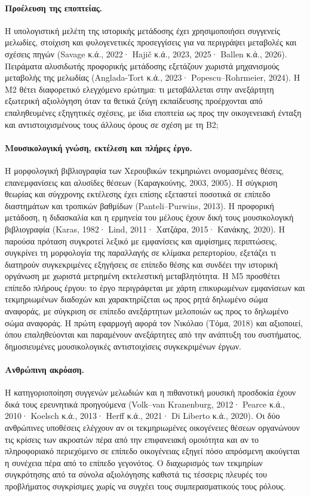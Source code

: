 \documentclass[11pt,a4paper]{article}
\begin{document}
\paragraph{Προέλευση της εποπτείας.} Η υπολογιστική μελέτη της ιστορικής μετάδοσης έχει χρησιμοποιήσει συγγενείς μελωδίες, στοίχιση και φυλογενετικές προσεγγίσεις για να περιγράψει μεταβολές και σχέσεις πηγών (Savage κ.ά., 2022· Hajič κ.ά., 2023, 2025· Ballen κ.ά., 2026). Πειράματα αλυσιδωτής προφορικής μετάδοσης εξετάζουν χωριστά μηχανισμούς μεταβολής της μελωδίας (Anglada-Tort κ.ά., 2023· Popescu--Rohrmeier, 2024). Η M2 θέτει διαφορετικό ελεγχόμενο ερώτημα: τι μεταβάλλεται στην ανεξάρτητη εξωτερική αξιολόγηση όταν τα θετικά ζεύγη εκπαίδευσης προέρχονται από επαληθευμένες εξηγητικές σχέσεις, με ίδια εποπτεία ως προς την οικογενειακή ένταξη και αντιστοιχισμένους τους άλλους όρους σε σχέση με τη B2;

\paragraph{Μουσικολογική γνώση, εκτέλεση και πλήρες έργο.} Η μορφολογική βιβλιογραφία των Χερουβικών τεκμηριώνει ονομασμένες θέσεις, επανεμφανίσεις και αλυσίδες θέσεων (Καραγκούνης, 2003, 2005). Η σύγκριση θεωρίας και σύγχρονης εκτέλεσης έχει επίσης εξεταστεί ποσοτικά σε επίπεδο διαστημάτων και τροπικών βαθμίδων (Panteli--Purwins, 2013). Η προφορική μετάδοση, η διδασκαλία και η ερμηνεία του μέλους έχουν δική τους μουσικολογική βιβλιογραφία (Karas, 1982· Lind, 2011· Χατζάρα, 2015· Κανάκης, 2020). Η παρούσα πρόταση συγκροτεί λεξικό με εμφανίσεις και αμφίσημες περιπτώσεις, συγκρίνει τη μορφολογία της παραλλαγής σε κλίμακα ρεπερτορίου, εξετάζει τι διατηρούν συγκεκριμένες εξηγήσεις σε επίπεδο θέσης και συνδέει την ιστορική οργάνωση με χωριστά μετρημένη εκτελεστική μεταβλητότητα. Η M5 προσθέτει επίπεδο πλήρους έργου: το έργο περιγράφεται με χάρτη επικυρωμένων εμφανίσεων και τεκμηριωμένων διαδοχών και χαρακτηρίζεται ως προς ρητά δηλωμένο σώμα αναφοράς, με σύγκριση σε επίπεδο ανεξάρτητων μελοποιών ως προς το δηλωμένο σώμα αναφοράς. Η πρώτη εφαρμογή αφορά τον Νικόλαο (Τόμα, 2018) και αξιοποιεί, όπου επαληθεύονται και παραμένουν ανεξάρτητες από την ανάπτυξη του συστήματος, δημοσιευμένες μουσικολογικές αντιστοιχίσεις συγκεκριμένων έργων.

\paragraph{Ανθρώπινη ακρόαση.} Η κατηγοριοποίηση συγγενών μελωδιών και η πιθανοτική μουσική προσδοκία έχουν δικά τους ερευνητικά προηγούμενα (Volk--van Kranenburg, 2012· Pearce κ.ά., 2010· Koelsch κ.ά., 2013· Herff κ.ά., 2021· Di Liberto κ.ά., 2020). Οι δύο ανθρώπινες υποθέσεις ελέγχουν αν οι τεκμηριωμένες οικογένειες θέσεων οργανώνουν τις κρίσεις των ακροατών πέρα από την επιφανειακή ομοιότητα και αν το πληροφοριακό περιεχόμενο σε επίπεδο οικογένειας εξηγεί πόσο απρόσμενη ακούγεται η συνέχεια πέρα από το επίπεδο γεγονότος. Ο διαχωρισμός των τεκμηρίων συγκρότησης από τα σύνολα αξιολόγησης καθιστά τις τέσσερις πλευρές του προβλήματος συγκρίσιμες χωρίς να συγχέει τους συμπερασματικούς τους ρόλους.
\end{document}
